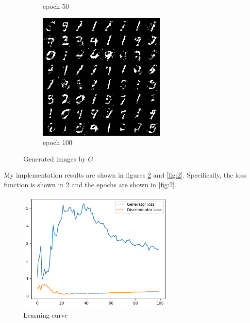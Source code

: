 \documentclass[a4paper]{article}
\theoremstyle{definition}
\newenvironment{soln}{
	\leavevmode\color{blue}\ignorespaces
}{}
\begin{document}
\begin{enumerate} [label=(\alph*)]
\begin{figure}[H]
\begin{subfigure}[b]{0.3\textwidth}
				\caption{epoch 50}
			\end{subfigure}
			\hfill
			\begin{subfigure}[b]{0.3\textwidth}
				\centering
				\includegraphics[width=\textwidth]{gan_q1_epoch100.png}
				\caption{epoch 100}
			\end{subfigure}
			\caption{Generated images by $G$}
			\label{fig:three graphs}
		\end{figure}
		
		
		\begin{soln}
            My implementation results are shown in figures \ref{fig:1} and \ref{fig:2}. Specifically, the loss function is shown in \ref{fig:1} and the epochs are shown in \ref{fig:2}.

            \begin{figure}[H]
			\centering
			\includegraphics[width=0.7\textwidth]{loss_q1.png}
			\caption{Learning curve}
			\label{fig:1}
		\end{figure}
		

\end{soln}
\end{enumerate}
\end{document}
